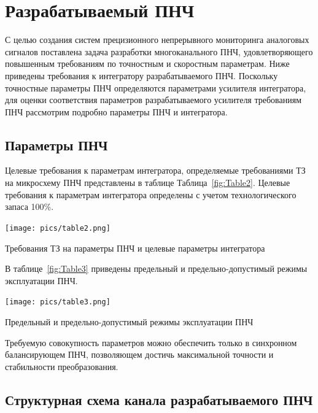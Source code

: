\documentclass[a4paper,12pt,oneside]{scrartcl}
\begin{document}
\clearpage




\section{Разрабатываемый ПНЧ}

С целью создания систем прецизионного непрерывного мониторинга аналоговых сигналов поставлена задача разработки многоканального ПНЧ, удовлетворяющего повышенным требованиям по точностным и скоростным параметрам. Ниже приведены требования к интегратору разрабатываемого ПНЧ. Поскольку точностные параметры ПНЧ определяются параметрами усилителя интегратора, для оценки соответствия параметров разрабатываемого усилителя требованиям ПНЧ рассмотрим подробно параметры ПНЧ и интегратора.





\subsection{Параметры ПНЧ}\label{sec:parameters}

Целевые требования к параметрам интегратора, определяемые требованиями ТЗ на микросхему ПНЧ представлены в таблице Таблица~\ref{fig:Table2}. Целевые требования к параметрам интегратора определены с учетом технологического запаса 100\%.

\begin{table}[!htb]
    \centering
    \texttt{[image: pics/table2.png]}
    \caption{Требования ТЗ на параметры ПНЧ и целевые параметры интегратора}
    \label{fig:Table2}
\end{table}
\FloatBarrier

В таблице~\ref{fig:Table3} приведены предельный и предельно-допустимый режимы эксплуатации ПНЧ.

\begin{table}[!htb]
    \centering
    \texttt{[image: pics/table3.png]}
    \caption{Предельный и предельно-допустимый режимы эксплуатации ПНЧ}
    \label{fig:Table3}
\end{table}
\FloatBarrier

Требуемую совокупность параметров можно обеспечить   только в синхронном балансирующем ПНЧ, позволяющем достичь максимальной точности и стабильности преобразования. 







\subsection{Структурная схема канала разрабатываемого ПНЧ}
\end{document}
